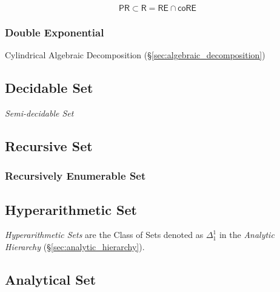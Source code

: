 \[
  \mathsf{PR} \subset \mathsf{R} = \mathsf{RE} \cap \mathsf{coRE}
\]



\subsubsection{Double Exponential}\label{sec:double_exponential}

Cylindrical Algebraic Decomposition
(\S\ref{sec:algebraic_decomposition})



\subsection{Decidable Set}\label{sec:decidable_set}

\emph{Semi-decidable Set}



\subsection{Recursive Set}\label{sec:recursive_set}

\subsubsection{Recursively Enumerable Set}\label{sec:recursively_enumerable}



\subsection{Hyperarithmetic Set}\label{sec:hyperarithmetic_set}

\emph{Hyperarithmetic Sets} are the Class of Sets denoted as
$\Delta^1_1$ in the \emph{Analytic Hierarchy}
(\S\ref{sec:analytic_hierarchy}).



\subsection{Analytical Set}\label{sec:analytical_set}

